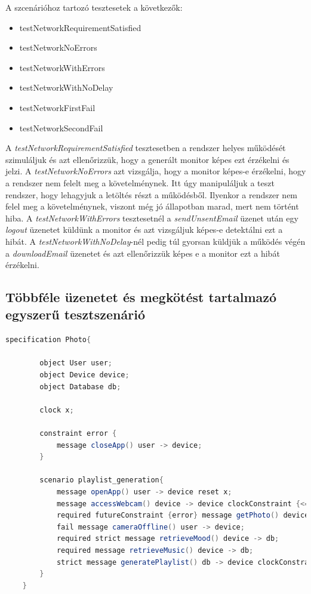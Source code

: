 A szcenárióhoz tartozó tesztesetek a következők:

\begin{itemize}
    \item testNetworkRequirementSatisfied
    \item testNetworkNoErrors
    \item testNetworkWithErrors
    \item testNetworkWithNoDelay
    \item testNetworkFirstFail
    \item testNetworkSecondFail
\end{itemize}

A \textit{testNetworkRequirementSatisfied} tesztesetben a rendszer helyes működését szimuláljuk és azt ellenőrizzük, hogy a generált monitor képes ezt érzékelni és jelzi.
A \textit{testNetworkNoErrors} azt vizsgálja, hogy a monitor képes-e érzékelni, hogy a rendszer nem felelt meg a követelménynek.
Itt úgy manipuláljuk a teszt rendszer, hogy lehagyjuk a letöltés részt a működésből.
Ilyenkor a rendszer nem felel meg a követelménynek, viszont még jó állapotban marad, mert nem történt hiba.
A \textit{testNetworkWithErrors} tesztesetnél a \textit{sendUnsentEmail} üzenet után egy \textit{logout} üzenetet küldünk a monitor és azt vizsgáljuk képes-e detektálni ezt a hibát.
A \textit{testNetworkWithNoDelay}-nél pedig túl gyorsan küldjük a működés végén a \textit{downloadEmail} üzenetet és azt ellenőrizzük képes e a monitor ezt a hibát érzékelni.

\clearpage\subsection{Többféle üzenetet és megkötést tartalmazó egyszerű tesztszenárió}

\begin{lstlisting}[language=java, frame=single, float=ht!, caption={Második tesztesethez tartozó szcenárió.},captionpos=b,label=second_scenario_test]
    specification Photo{

        object User user;
        object Device device;
        object Database db;

        clock x;

        constraint error {
            message closeApp() user -> device;
        }

        scenario playlist_generation{
            message openApp() user -> device reset x;
            message accessWebcam() device -> device clockConstraint {<=(x, 5)} reset x;
            required futureConstraint {error} message getPhoto() device -> user;
            fail message cameraOffline() user -> device;
            required strict message retrieveMood() device -> db;
            required message retrieveMusic() device -> db;
            strict message generatePlaylist() db -> device clockConstraint {<(x, 15)};
        }
    }
\end{lstlisting}

